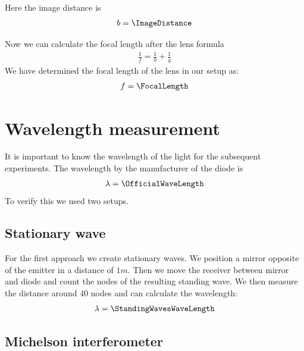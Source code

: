 \documentclass[a4paper,10pt,twocolumn]{article}
\begin{document}
    Here the image distance is 
    \begin{align*}
        b = \ImageDistance
    \end{align*}

    Now we can calculate the focal length after the lens formula
    \begin{align}
        \label{eq:LensFormula}
        \frac{1}{f} = \frac{1}{b} + \frac{1}{g}
    \end{align}
    We have determined the focal length of the lens in our setup as:
    \begin{align*}
        f = \FocalLength
    \end{align*}
    \section{Wavelength measurement}
    It is important to know the wavelength of the light for the subsequent experiments.
    The wavelength by the manufacturer of the diode is
    \begin{align*}
        \lambda = \OfficialWaveLength
    \end{align*}
    To verify this we used two setups.
    \subsection{Stationary wave}
    For the first approach we create stationary waves.
    We position a mirror opposite of the emitter in a distance of $1m$.
    Then we move the receiver between mirror and diode and count the nodes of the resulting standing wave.
    We then measure the distance around 40 nodes and can calculate the wavelength:
    \begin{align*}
        \lambda = \StandingWavesWaveLength
    \end{align*}
    \subsection{Michelson interferometer}
\end{document}
